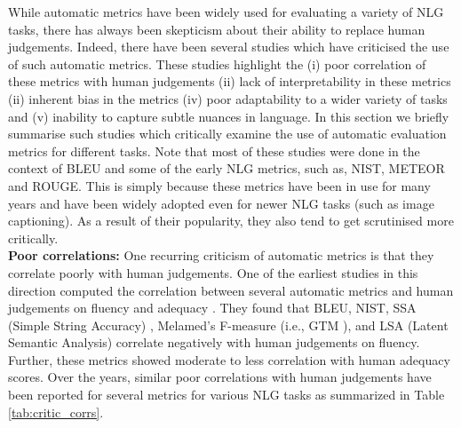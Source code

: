 \label{sec:criticism}
While automatic metrics have been widely used for evaluating a variety of NLG tasks, there has always been skepticism about their ability to replace human judgements. Indeed, there have been several studies which have criticised the use of such automatic metrics. These studies highlight the (i) poor correlation of these metrics with human judgements (ii) lack of interpretability in these metrics (ii) inherent bias in the metrics (iv) poor adaptability to a wider variety of tasks and (v) inability to capture subtle nuances in language. In this section we briefly summarise such studies which critically examine the use of automatic evaluation metrics for different tasks. Note that most of these studies were done in the context of BLEU and some of the early NLG metrics, such as, NIST, METEOR and ROUGE. This is simply because these metrics have been in use for many years and have been widely adopted even for newer NLG tasks (such as image captioning). As a result of their popularity, they also tend to get scrutinised more critically. \\
\textbf{Poor correlations: }
One recurring criticism of automatic metrics is that they correlate poorly with human judgements. One of the earliest studies in this direction computed the correlation between several automatic metrics and human judgements on fluency and adequacy
. They found that BLEU, NIST, SSA (Simple String Accuracy) , Melamed's F-measure (i.e., GTM ), and LSA (Latent Semantic Analysis)   correlate negatively with human judgements on fluency. Further, these metrics showed moderate to less correlation with human adequacy scores. 
Over the years, similar poor correlations with human judgements have been reported for several metrics for various NLG tasks as summarized in Table \ref{tab:critic_corrs}.\\
